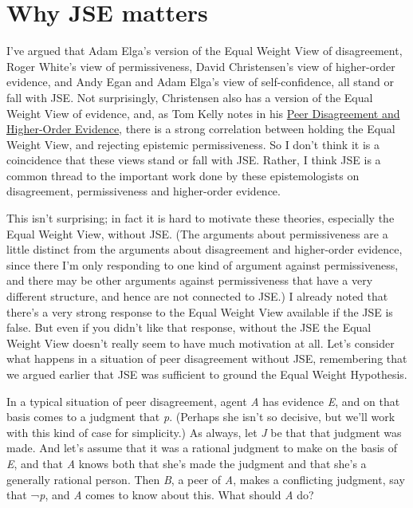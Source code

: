 \documentclass[
  11pt,
  letterpaper,
  DIV=11,
  numbers=noendperiod,
  twoside]{scrartcl}
\begin{document}
\section{Why JSE matters}\label{why-jse-matters}

I've argued that Adam Elga's version of the Equal Weight View of
disagreement, Roger White's view of permissiveness, David Christensen's
view of higher-order evidence, and Andy Egan and Adam Elga's view of
self-confidence, all stand or fall with JSE. Not surprisingly,
Christensen also has a version of the Equal Weight View of evidence,
and, as Tom Kelly notes in his
\href{http://www.princeton.edu/~tkelly/papers/KellyPeerDis-1.doc}{Peer
Disagreement and Higher-Order Evidence}, there is a strong correlation
between holding the Equal Weight View, and rejecting epistemic
permissiveness. So I don't think it is a coincidence that these views
stand or fall with JSE. Rather, I think JSE is a common thread to the
important work done by these epistemologists on disagreement,
permissiveness and higher-order evidence.

This isn't surprising; in fact it is hard to motivate these theories,
especially the Equal Weight View, without JSE. (The arguments about
permissiveness are a little distinct from the arguments about
disagreement and higher-order evidence, since there I'm only responding
to one kind of argument against permissiveness, and there may be other
arguments against permissiveness that have a very different structure,
and hence are not connected to JSE.) I already noted that there's a very
strong response to the Equal Weight View available if the JSE is false.
But even if you didn't like that response, without the JSE the Equal
Weight View doesn't really seem to have much motivation at all. Let's
consider what happens in a situation of peer disagreement without JSE,
remembering that we argued earlier that JSE was sufficient to ground the
Equal Weight Hypothesis.

In a typical situation of peer disagreement, agent \emph{A} has evidence
\emph{E}, and on that basis comes to a judgment that \emph{p}. (Perhaps
she isn't so decisive, but we'll work with this kind of case for
simplicity.) As always, let \emph{J} be that that judgment was made. And
let's assume that it was a rational judgment to make on the basis of
\emph{E}, and that \emph{A} knows both that she's made the judgment and
that she's a generally rational person. Then \emph{B}, a peer of
\emph{A}, makes a conflicting judgment, say that ¬\emph{p}, and \emph{A}
comes to know about this. What should \emph{A} do?
\end{document}
